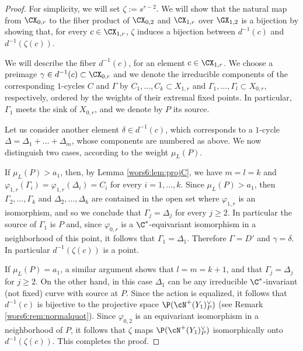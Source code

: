 \documentclass[reqno]{amsproc}
\theoremstyle{definition}
\def\prur{d}
\begin{document}
\begin{proof}
For simplicity, we will set $\zeta:=s^{r-2}$.  We will show that the natural map from $\CX_{0,r}$ to the fiber product of $\CX_{0,2}$ and $\CX_{1,r}$ over $\GX_{1,2}$ is a bijection by showing that, for every $c\in \CX_{1,r}$, $\zeta$ induces a bijection between $\prur^{-1}(c)$ and $\prur^{-1}(\zeta(c))$. 

 We will describe the fiber $\prur^{-1}(c)$, for an element $c\in \CX_{1,r}$. 
We choose a preimage $\gamma\in \prur^{-1}(c) \subset \CX_{0,r}$ and we denote the irreducible components of the corresponding $1$-cycles $C$ and $\Gamma$ by $C_1,\dots, C_k\subset X_{1,r}$ and
 $\Gamma_1,\dots, \Gamma_{l}\subset X_{0,r}$,  respectively, ordered by the weights of their extremal fixed points. 
 In particular, $\Gamma_1$ meets the sink of $X_{0,r}$, and we denote by $P$ its source. 

 Let us consider another element $\delta \in \prur^{-1}(c)$, which corresponds to a $1$-cycle $\Delta=\Delta_1+\dots+\Delta_{m}$, whose components are numbered as above. We now distinguish two cases, according to the weight $\mu_L(P)$.  

If $\mu_L(P)>a_1$,  then, by Lemma \ref{wors6:lem:projC}, we have $m=l=k$ and $\varphi_{1,r}(\Gamma_i)=\varphi_{1,r}(\Delta_i)=C_i$ for every $i=1, \dots, k$. Since $\mu_L(P)>a_1$, then  $\Gamma_2,\dots,\Gamma_{k}$ and $\Delta_2,\dots,\Delta_{k}$ are contained in the open set where $\varphi_{1,r}$ is an isomorphism, and so we conclude that $\Gamma_j=\Delta_j$ for every $j\geq 2$. In particular the source of $\Gamma_1$ is $P$ and, since $\varphi_{0,r}$ is a $\C^*$-equivariant isomorphism in a neighborhood of this point, it follows that $\Gamma_1=\Delta_1$. Therefore $\Gamma=D'$ and $\gamma=\delta$. In particular $\prur^{-1}(\zeta(c))$ is a point.

If $\mu_L(P)=a_1$, a similar argument shows that $l=m=k+1$, and that $\Gamma_j=\Delta_j$ for $j\geq 2$. On the other hand, in this case $\Delta_1$ can be any irreducible $\C^*$-invariant (not fixed) curve with source at $P$. Since the action is equalized, it follows that $\prur^{-1}(c)$ is bijective to  the projective space $\P(\cN^{+}(Y_1)^{\vee}_{P})$ (see Remark \ref{wors6:rem:normalquot}). Since $\varphi_{0,2}$ is an equivariant isomorphism in a neighborhood of $P$, it follows that $\zeta$ maps $\P(\cN^{+}(Y_1)^{\vee}_{P})$ isomorphically onto $\prur^{-1}(\zeta(c))$. This completes the proof.
\end{proof}
\end{document}
